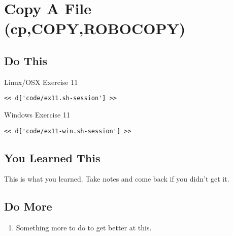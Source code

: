 \chapter{Copy A File (cp,COPY,ROBOCOPY)}

\section{Do This}

\begin{code}{Linux/OSX Exercise 11}
\begin{Verbatim}
<< d['code/ex11.sh-session'] >>
\end{Verbatim}
\end{code}

\begin{code}{Windows Exercise 11}
\begin{Verbatim}
<< d['code/ex11-win.sh-session'] >>
\end{Verbatim}
\end{code}

\section{You Learned This}

This is what you learned.  Take notes and come back if you didn't get it.

\section{Do More}

\begin{enumerate}
\item Something more to do to get better at this.
\end{enumerate}

